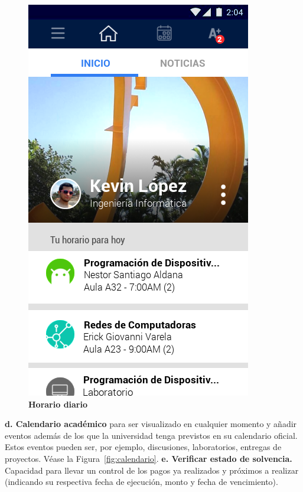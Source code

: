 \documentclass[12pt]{article}
\begin{document}
\begin{figure}[H]
	\caption{\textbf{Horario diario}}
	\label{fig:horarioDiario}
	\includegraphics[scale=0.50]{img/2.png}
	\centering
\end{figure}

\setlength{\parindent}{0cm}
\textbf{d. Calendario académico} para ser visualizado en cualquier momento y añadir eventos además de los que la universidad tenga previstos en su calendario oficial. Estos eventos pueden ser, por ejemplo, discusiones, laboratorios, entregas de proyectos. Véase la Figura~\ref{fig:calendario}.
\newline
\newline
\textbf{e. Verificar estado de solvencia. } Capacidad para llevar un control de los pagos ya realizados y pr\'oximos a realizar (indicando su respectiva fecha de ejecuci\'on, monto y fecha de vencimiento). 
\end{document}
